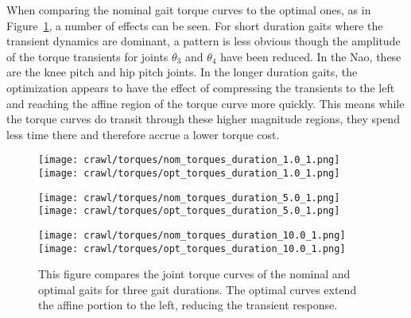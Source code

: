 When comparing the nominal gait torque curves to the optimal ones, as in
Figure~\ref{fig:vrep_comparison_joint_torques_by_duration1}, a number of effects can be seen.
For short duration gaits where the transient dynamics are dominant, a pattern is less
obvious though the amplitude of the torque transients for joints $\theta_3$ and $\theta_4$
have been reduced. In the Nao, these are the knee pitch and hip pitch joints.
In the longer duration gaits, the optimization appears to have the effect of compressing
the transients to the left and reaching the affine region of the torque curve more quickly.
This means while the torque curves do transit through these higher magnitude regions,
they spend less time there and therefore accrue a lower torque cost.

\begin{figure}
  \centerline{
    \texttt{[image: crawl/torques/nom\_torques\_duration\_1.0\_1.png]}
    \texttt{[image: crawl/torques/opt\_torques\_duration\_1.0\_1.png]}
  }
  \centerline{
    \texttt{[image: crawl/torques/nom\_torques\_duration\_5.0\_1.png]}
    \texttt{[image: crawl/torques/opt\_torques\_duration\_5.0\_1.png]}
  }
  \centerline{
    \texttt{[image: crawl/torques/nom\_torques\_duration\_10.0\_1.png]}
    \texttt{[image: crawl/torques/opt\_torques\_duration\_10.0\_1.png]}
  }
  \caption{This figure compares the joint torque curves of the nominal and optimal
           gaits for three gait durations. The optimal curves extend the affine portion to the left, 
           reducing the transient response.}
  \label{fig:vrep_comparison_joint_torques_by_duration1}
\end{figure}


